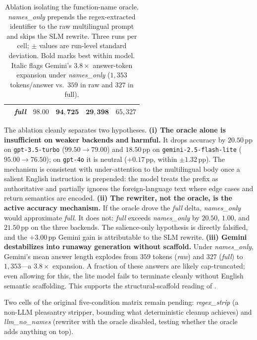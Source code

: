\documentclass[11pt,a4paper,twocolumn]{article}
\begin{document}
\begin{table}[t]
\begin{tabular}{llcccc}
                                               & \textit{full}        & $\mathbf{98.00}$  & $\mathbf{94{,}725}$  & $\mathbf{29{,}398}$  & $65{,}327$ \\
\bottomrule
\end{tabular}
\caption{Ablation isolating the function-name oracle. \textit{names\_only} prepends the regex-extracted identifier to the raw multilingual prompt and skips the SLM rewrite. Three runs per cell; $\pm$ values are run-level standard deviation. Bold marks best within model. Italic flags Gemini's $3.8\times$ answer-token expansion under \textit{names\_only} ($1{,}353$ tokens/answer vs.\ $359$ in raw and $327$ in full).}
\label{tab:ablation}
\end{table}

The ablation cleanly separates two hypotheses. \textbf{(i) The oracle alone is insufficient on weaker backends and harmful.} It drops accuracy by $20.50$\,pp on \texttt{gpt-3.5-turbo} ($99.50\to 79.00$) and $18.50$\,pp on \texttt{gemini-2.5-flash-lite} ($95.00\to 76.50$); on \texttt{gpt-4o} it is neutral ($+0.17$\,pp, within $\pm 1.32$\,pp). The mechanism is consistent with under-attention to the multilingual body once a salient English instruction is prepended: the model treats the prefix as authoritative and partially ignores the foreign-language text where edge cases and return semantics are encoded. \textbf{(ii) The rewriter, not the oracle, is the active accuracy mechanism.} If the oracle drove the \textit{full} delta, \textit{names\_only} would approximate \textit{full}. It does not: \textit{full} exceeds \textit{names\_only} by $20.50$, $1.00$, and $21.50$\,pp on the three backends. The salience-only hypothesis is directly falsified, and the $+3.00$\,pp Gemini gain is attributable to the SLM rewrite. \textbf{(iii) Gemini destabilizes into runaway generation without scaffold.} Under \textit{names\_only}, Gemini's mean answer length explodes from $359$ tokens (\textit{raw}) and $327$ (\textit{full}) to $1{,}353$---a $3.8\times$ expansion. A fraction of these answers are likely cap-truncated; even allowing for this, the lite model fails to terminate cleanly without English semantic scaffolding. This supports the structural-scaffold reading of \cite{ma2025sketch}.

Two cells of the original five-condition matrix remain pending: \textit{regex\_strip} (a non-LLM pleasantry stripper, bounding what deterministic cleanup achieves) and \textit{llm\_no\_names} (rewriter with the oracle disabled, testing whether the oracle adds anything on top).
\end{document}
